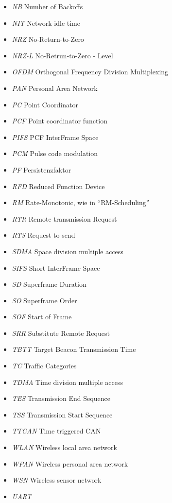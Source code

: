 \documentclass{article}
\begin{document}
\begin{itemize}
	\item \emph{NB} Number of Backoffs
	\item \emph{NIT} Network idle time
	\item \emph{NRZ} No-Return-to-Zero
	\item \emph{NRZ-L} No-Retrun-to-Zero - Level
	\item \emph{OFDM} Orthogonal Frequency Division Multiplexing
	\item \emph{PAN} Personal Area Network
	\item \emph{PC} Point Coordinator
	\item \emph{PCF} Point coordinator function
	\item \emph{PIFS} PCF InterFrame Space
	\item \emph{PCM} Pulse code modulation
	\item \emph{PF} Persistenzfaktor
	\item \emph{RFD} Reduced Function Device
	\item \emph{RM} Rate-Monotonic, wie in "`RM-Scheduling"'
	\item \emph{RTR} Remote transmission Request
	\item \emph{RTS} Request to send
	\item \emph{SDMA} Space division multiple access
	\item \emph{SIFS} Short InterFrame Space
	\item \emph{SD} Superframe Duration
	\item \emph{SO} Superframe Order
	\item \emph{SOF} Start of Frame
	\item \emph{SRR} Substitute Remote Request
	\item \emph{TBTT} Target Beacon Transmission Time
	\item \emph{TC} Traffic Categories
	\item \emph{TDMA} Time division multiple access
	\item \emph{TES} Transmission End Sequence
	\item \emph{TSS} Transmission Start Sequence
	\item \emph{TTCAN} Time triggered CAN
	\item \emph{WLAN} Wireless local area network
	\item \emph{WPAN} Wireless personal area network
	\item \emph{WSN} Wireless sensor network
	\item \emph{UART}
\end{itemize}
\end{document}
